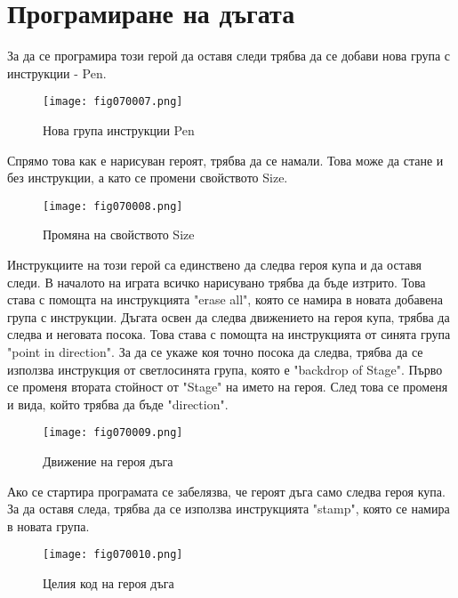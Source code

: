 \section{Програмиране на дъгата}
За да се програмира този герой да оставя следи трябва да се добави нова група с инструкции - Pen.

\begin{figure}[H]
  \centering
  \texttt{[image: fig070007.png]}
  \caption{Нова група инструкции Pen}
\label{fig070007}
\end{figure}

Спрямо това как е нарисуван героят, трябва да се намали. Това може да стане и без инструкции, а като се промени свойството Size.

\begin{figure}[H]
  \centering
  \texttt{[image: fig070008.png]}
  \caption{Промяна на свойството Size}
\label{fig070008}
\end{figure}

Инструкциите на този герой са единствено да следва героя купа и да оставя следи. В началото на играта всичко нарисувано трябва да бъде изтрито. Това става с помощта на инструкцията "erase all", която се намира в новата добавена група с инструкции. Дъгата освен да следва движението на героя купа, трябва да следва и неговата посока. Това става с помощта на инструкцията от синята група "point in direction". За да се укаже коя точно посока да следва, трябва да се използва инструкция от светлосинята група, която е "backdrop of Stage". Първо се променя втората стойност от "Stage" на името на героя. След това се променя и вида, който трябва да бъде "direction".

\begin{figure}[H]
  \centering
  \texttt{[image: fig070009.png]}
  \caption{Движение на героя дъга}
\label{fig070009}
\end{figure}

Ако се стартира програмата се забелязва, че героят дъга само следва героя купа. За да оставя следа, трябва да се използва инструкцията "stamp", която се намира в новата група.

\begin{figure}[H]
  \centering
  \texttt{[image: fig070010.png]}
  \caption{Целия код на героя дъга}
\label{fig070010}
\end{figure}

